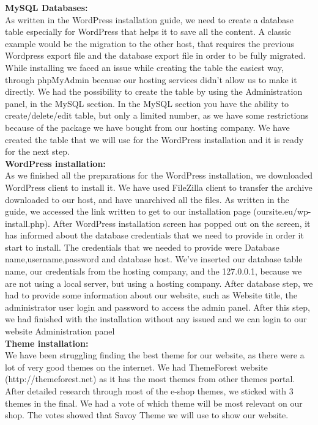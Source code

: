 \documentclass[12p]{article}
\begin{document}
\textbf{MySQL Databases:}
\\
As written in the WordPress installation guide, we need to create a database table especially for WordPress that helps it to save all the content. A classic example would be the migration to the other host, that requires the previous Wordpress export file and the database export file in order to be fully migrated. While installing we faced an issue while creating the table the easiest way, through phpMyAdmin because our hosting services didn’t allow us to make it directly. We had the possibility to create the table by using the Administration panel, in the MySQL section. In the MySQL section you have the ability to create/delete/edit table, but only a limited number, as we have some restrictions because of the package we have bought from our hosting company. We have created the table that we will use for the WordPress installation and it is ready for the next step. \\

\textbf{WordPress installation:}
\\
As we finished all the preparations for the WordPress installation, we downloaded WordPress client to install it. We have used FileZilla client to transfer the archive downloaded to our host, and have unarchived all the files. As written in the guide, we accessed the link written to get to our installation page (oursite.eu/wp-install.php). After WordPress installation screen has popped out on the screen, it has informed about the database credentials that we need to provide in order it start to install. The credentials that we needed to provide were Database name,username,password and database host. We’ve inserted our database table name, our credentials from the hosting company, and the 127.0.0.1, because we are not using a local server, but using a hosting company. After database step, we had to provide some information about our website, such as Website title, the administrator user login and password to access the admin panel. After this step, we had finished with the installation without any issued and we can login to our website Administration panel \\

\textbf{Theme installation:}
\\
We have been struggling finding the best theme for our website, as there were a lot of very good themes on the internet. We had ThemeForest website (http://themeforest.net) as it has the most themes from other themes portal. After detailed research through most of the e-shop themes, we sticked with 3 themes in the final. We had a vote of which theme will be most relevant on our shop. The votes showed that Savoy Theme we will use to show our website.
\end{document}
